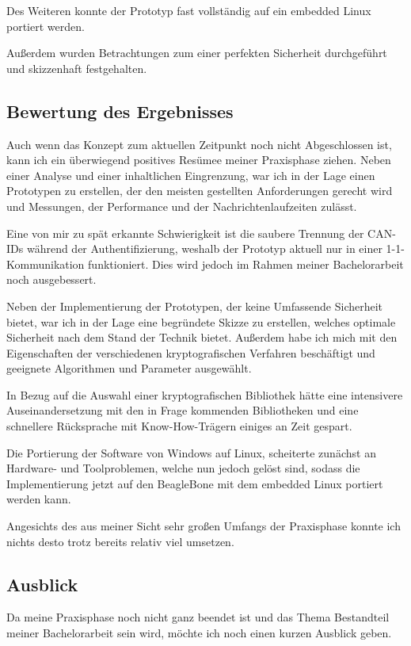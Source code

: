 Des Weiteren konnte der Prototyp fast vollständig auf ein embedded Linux portiert werden.

Außerdem wurden Betrachtungen zum einer perfekten Sicherheit durchgeführt und skizzenhaft festgehalten. 



\subsection{Bewertung des Ergebnisses} 
Auch wenn das Konzept zum aktuellen Zeitpunkt noch nicht Abgeschlossen ist, kann ich ein überwiegend positives Resümee meiner Praxisphase ziehen. 
Neben einer Analyse und einer inhaltlichen Eingrenzung, war ich in der Lage einen Prototypen zu erstellen, der den meisten gestellten Anforderungen gerecht wird und Messungen, der Performance und der Nachrichtenlaufzeiten zulässt. 

Eine von mir zu spät erkannte Schwierigkeit ist die saubere Trennung der CAN-IDs während der Authentifizierung, weshalb der Prototyp aktuell nur in einer 1-1-Kommunikation funktioniert. Dies wird jedoch im Rahmen meiner Bachelorarbeit noch ausgebessert.

Neben der Implementierung der Prototypen, der keine Umfassende Sicherheit bietet, war ich in der Lage eine begründete Skizze zu erstellen, welches optimale Sicherheit nach dem Stand der Technik bietet. Außerdem habe ich mich mit den Eigenschaften der verschiedenen kryptografischen Verfahren beschäftigt und geeignete Algorithmen und Parameter ausgewählt.

In Bezug auf die Auswahl einer kryptografischen Bibliothek hätte eine intensivere Auseinandersetzung mit den in Frage kommenden Bibliotheken und eine schnellere Rücksprache mit Know-How-Trägern einiges an Zeit gespart. 

Die Portierung der Software von Windows auf Linux, scheiterte zunächst an Hardware- und Toolproblemen, welche nun jedoch gelöst sind, sodass die Implementierung jetzt auf den BeagleBone mit dem embedded Linux portiert werden kann.

Angesichts des aus meiner Sicht sehr großen Umfangs der Praxisphase konnte ich nichts desto trotz bereits relativ viel umsetzen.

\subsection{Ausblick}
Da meine Praxisphase noch nicht ganz beendet ist und das Thema Bestandteil meiner Bachelorarbeit sein wird, möchte ich noch einen kurzen Ausblick geben. 

